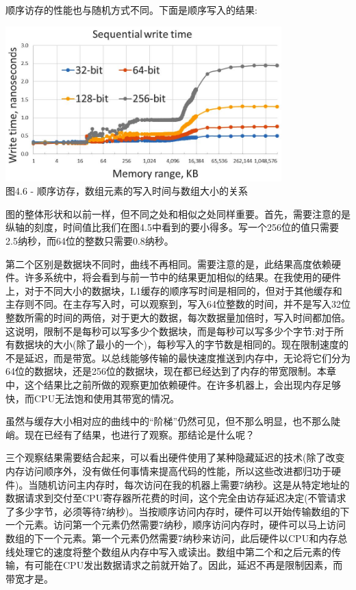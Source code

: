 顺序访存的性能也与随机方式不同。下面是顺序写入的结果:

\begin{center}
\includegraphics[width=0.8\textwidth]{content/1/chapter4/images/6.jpg}\\
图4.6 - 顺序访存，数组元素的写入时间与数组大小的关系
\end{center}

图的整体形状和以前一样，但不同之处和相似之处同样重要。首先，需要注意的是纵轴的刻度，时间值比我们在图4.5中看到的要小得多。写一个256位的值只需要2.5纳秒，而64位的整数只需要0.8纳秒。

第二个区别是数据块不同时，曲线不再相同。需要注意的是，此结果高度依赖硬件。许多系统中，将会看到与前一节中的结果更加相似的结果。在我使用的硬件上，对于不同大小的数据块，L1缓存的顺序写时间是相同的，但对于其他缓存和主存则不同。在主存写入时，可以观察到，写入64位整数的时间，并不是写入32位整数所需的时间的两倍，对于更大的数据，每次数据量加倍时，写入时间都加倍。这说明，限制不是每秒可以写多少个数据块，而是每秒可以写多少个字节:对于所有数据块的大小(除了最小的一个)，每秒写入的字节数是相同的。现在限制速度的不是延迟，而是带宽。以总线能够传输的最快速度推送到内存中，无论将它们分为64位的数据块，还是256位的数据块，现在都已经达到了内存的带宽限制。本章中，这个结果比之前所做的观察更加依赖硬件。在许多机器上，会出现内存足够快，而CPU无法饱和使用其带宽的情况。

虽然与缓存大小相对应的曲线中的“阶梯”仍然可见，但不那么明显，也不那么陡峭。现在已经有了结果，也进行了观察。那结论是什么呢？


三个观察结果需要结合起来，可以看出硬件使用了某种隐藏延迟的技术(除了改变内存访问顺序外，没有做任何事情来提高代码的性能，所以这些改进都归功于硬件)。当随机访问主内存时，每次访问在我的机器上需要7纳秒。这是从特定地址的数据请求到交付至CPU寄存器所花费的时间，这个完全由访存延迟决定(不管请求了多少字节，必须等待7纳秒)。当按顺序访问内存时，硬件可以开始传输数组的下一个元素。访问第一个元素仍然需要7纳秒，顺序访问内存时，硬件可以马上访问数组的下一个元素。第一个元素仍然需要7纳秒来访问，此后硬件以CPU和内存总线处理它的速度将整个数组从内存中写入或读出。数组中第二个和之后元素的传输，有可能在CPU发出数据请求之前就开始了。因此，延迟不再是限制因素，而带宽才是。

